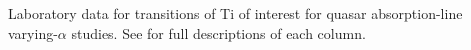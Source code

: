 Laboratory data for transitions of Ti of interest for quasar absorption-line varying-$\alpha$ studies. See  for full descriptions of each column.
